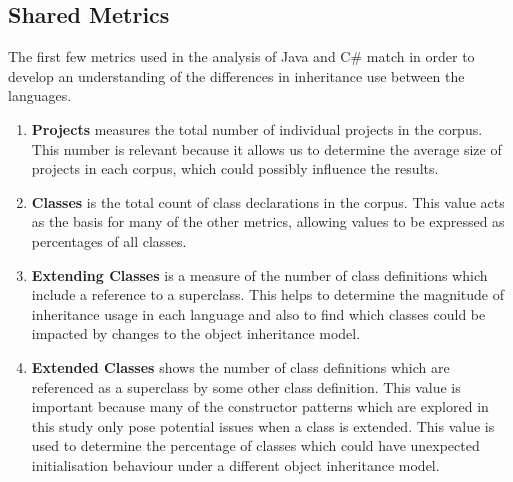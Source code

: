 \subsection{Shared Metrics}
The first few metrics used in the analysis of Java and C\# match in order to develop an understanding of the differences in inheritance use between the languages.
\begin{enumerate}
	\item \textbf{Projects} measures the total number of individual projects in the corpus. This number is relevant because it allows us to determine the average size of projects in each corpus, which could possibly influence the results.
	\item \textbf{Classes} is the total count of class declarations in the corpus. This value acts as the basis for many of the other metrics, allowing values to be expressed as percentages of all classes.
	\item \textbf{Extending Classes} is a measure of the number of class definitions which include a reference to a superclass. This helps to determine the magnitude of inheritance usage in each language and also to find which classes could be impacted by changes to the object inheritance model.
	\item \textbf{Extended Classes} shows the number of class definitions which are referenced as a superclass by some other class definition. This value is important because many of the constructor patterns which are explored in this study only pose potential issues when a class is extended. This value is used to determine the percentage of classes which could have unexpected initialisation behaviour under a different object inheritance model.
\end{enumerate}

